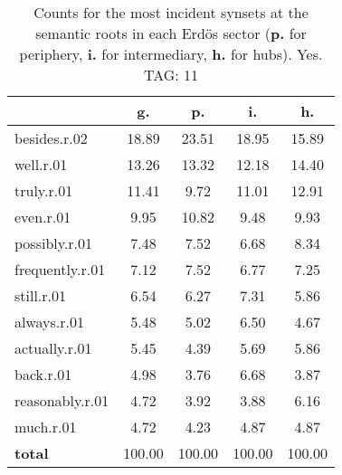\begin{table}[h!]
\begin{center}
\begin{tabular}{| l | c | c | c | c |}\hline
 & g. & p. & i. & h. \\\hline
besides.r.02 & 18.89  & 23.51  & 18.95  & 15.89 \\\hline
well.r.01 & 13.26  & 13.32  & 12.18  & 14.40 \\\hline
truly.r.01 & 11.41  & 9.72  & 11.01  & 12.91 \\\hline
even.r.01 & 9.95  & 10.82  & 9.48  & 9.93 \\\hline
possibly.r.01 & 7.48  & 7.52  & 6.68  & 8.34 \\\hline
frequently.r.01 & 7.12  & 7.52  & 6.77  & 7.25 \\\hline
still.r.01 & 6.54  & 6.27  & 7.31  & 5.86 \\\hline
always.r.01 & 5.48  & 5.02  & 6.50  & 4.67 \\\hline
actually.r.01 & 5.45  & 4.39  & 5.69  & 5.86 \\\hline
back.r.01 & 4.98  & 3.76  & 6.68  & 3.87 \\\hline
reasonably.r.01 & 4.72  & 3.92  & 3.88  & 6.16 \\\hline
much.r.01 & 4.72  & 4.23  & 4.87  & 4.87 \\\hline
{{\bf total}} & 100.00  & 100.00  & 100.00  & 100.00 \\\hline
\end{tabular}
\caption{Counts for the most incident synsets at the semantic roots in each Erd\"os sector ({\bf p.} for periphery, {\bf i.} for intermediary, {\bf h.} for hubs). Yes. TAG: 11}
\end{center}
\end{table}